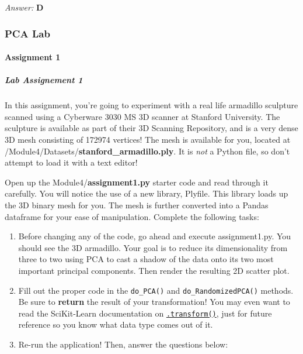 \documentclass[11pt]{article}
\providecommand{\tightlist}{%
      \setlength{\itemsep}{0pt}\setlength{\parskip}{0pt}}
\begin{document}
\emph{Answer:} \textbf{D}

    \hypertarget{pca-lab}{%
\subsubsection{PCA Lab}\label{pca-lab}}

\hypertarget{assignment-1}{%
\paragraph{Assignment 1}\label{assignment-1}}

\hypertarget{lab-assignement-1}{%
\subparagraph{Lab Assignement 1}\label{lab-assignement-1}}

In this assignment, you're going to experiment with a real life
armadillo sculpture scanned using a Cyberware 3030 MS 3D scanner at
Stanford University. The sculpture is available as part of their 3D
Scanning Repository, and is a very dense 3D mesh consisting of 172974
vertices! The mesh is available for you, located at
/Module4/Datasets/\textbf{stanford\_armadillo.ply}. It is \emph{not} a
Python file, so don't attempt to load it with a text editor!

Open up the Module4/\textbf{assignment1.py} starter code and read
through it carefully. You will notice the use of a new library, Plyfile.
This library loads up the 3D binary mesh for you. The mesh is further
converted into a Pandas dataframe for your ease of manipulation.
Complete the following tasks:

\begin{enumerate}
\def\labelenumi{\arabic{enumi}.}
\tightlist
\item
  Before changing any of the code, go ahead and execute assignment1.py.
  You should see the 3D armadillo. Your goal is to reduce its
  dimensionality from three to two using PCA to cast a shadow of the
  data onto its two most important principal components. Then render the
  resulting 2D scatter plot.
\item
  Fill out the proper code in the \texttt{do\_PCA()} and
  \texttt{do\_RandomizedPCA()} methods. Be sure to \textbf{return} the
  result of your transformation! You may even want to read the
  SciKit-Learn documentation on
  \href{http://scikit-learn.org/stable/modules/generated/sklearn.decomposition.PCA.html\#sklearn.decomposition.PCA.transform}{\texttt{.transform()}},
  just for future reference so you know what data type comes out of it.
\item
  Re-run the application! Then, answer the questions below:
\end{enumerate}
\end{document}
